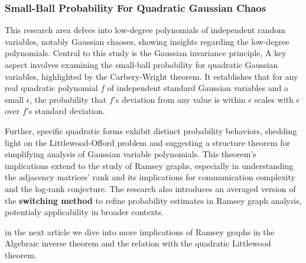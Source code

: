 \subsubsection{Small-Ball Probability For Quadratic Gaussian Chaos}
This research area delves into low-degree polynomials of independent random variables,
notably Gaussian chaoses,
showing insights regarding the low-degree polynomials.
Central to this study is the Gaussian invariance principle,
A key aspect involves examining the small-ball probability for
quadratic Gaussian variables, highlighted by the Carbery-Wright theorem.
It establishes that for any real quadratic polynomial $f$ of
independent standard Gaussian variables and a small
$\epsilon$, 
the probability that $f$'s deviation from any value is within
$\epsilon$ scales with $\epsilon$ over $f$'s standard deviation.

Further, specific quadratic forms exhibit distinct
probability behaviors, shedding light on the 
Littlewood-Offord problem and suggesting a structure theorem
for simplifying analysis of Gaussian variable polynomials.
This theorem's implications extend to the study of Ramsey graphs,
especially in understanding the adjacency matrices' rank and its
implications for communication complexity and the 
log-rank conjecture.
The research also introduces an averaged version of the 
\textbf{switching method} to refine probability estimates
in Ramsey graph analysis,
potentialy applicability in broader contexts.


in the next article we dive into more implications of Ramsey graphs in the 
Algebraic inverse theorem and the relation with the quadratic Littlewood theorem.


